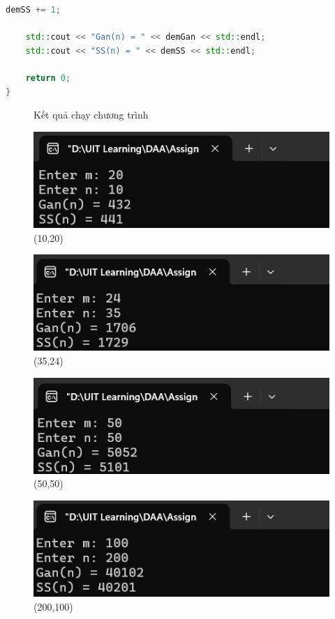 \documentclass[12pt, letterpaper]{article}
\begin{document}
\begin{enumerate}
\begin{lstlisting}[language=C++]
    demSS += 1;
    
    std::cout << "Gan(n) = " << demGan << std::endl;
    std::cout << "SS(n) = " << demSS << std::endl;
    
    return 0;
}
  \end{lstlisting}

\begin{figure}[!]
	\centering \large Kết quả chạy chương trình
	\caption{(10,20)}
	\includegraphics{Bai11_1}
\end{figure}
\begin{figure}[!]
	\centering
	\caption{(35,24)}
	\includegraphics{Bai11_2}
\end{figure}
\begin{figure}[!]
	\centering
	\caption{(50,50)}
	\includegraphics{Bai11_3}
\end{figure}
\begin{figure}[!]
	\centering
	\caption{(200,100)}
	\includegraphics{Bai11_4}

\end{figure}
\end{enumerate}
\end{document}
